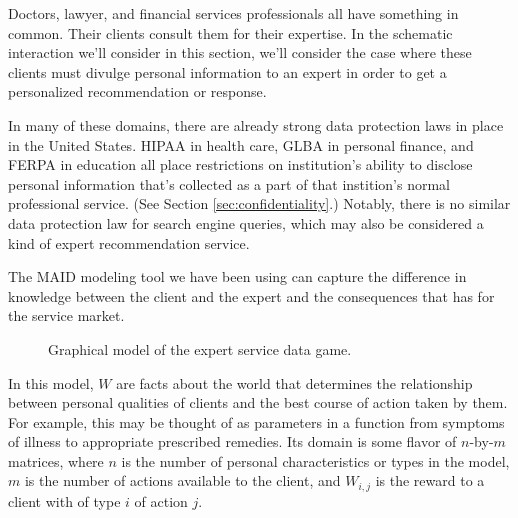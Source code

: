 \documentclass[../thesis.tex]{subfiles}
\begin{document}
Doctors, lawyer, and financial services professionals
all have something in common.
Their clients consult them for their expertise.
In the schematic interaction we'll consider in this
section, we'll consider the case where these clients
must divulge personal information to an expert in
order to get a personalized recommendation or response.

In many of these domains, there are already strong data
protection laws in place in the United States. 
HIPAA in health care,
GLBA in personal finance, and FERPA in education all
place restrictions on institution's ability to disclose personal
information that's collected as a part of that instition's
normal professional service. (See Section \ref{sec:confidentiality}.)
Notably, there is no similar data protection law for search
engine queries, which may also be considered a kind of expert
recommendation service.

The MAID modeling tool we have been using can capture
the difference in knowledge between the client and
the expert and the consequences that has for the service
market.

\begin{figure}
\begin{center}
\end{center}
\caption{Graphical model of the expert service data game.}
\end{figure}

In this model, $W$ are facts about the world that
determines the relationship between personal qualities
of clients and the best course of action taken by them.
For example, this may be thought of as parameters in
a function from symptoms of illness to appropriate prescribed
remedies.
Its domain is some flavor of $n$-by-$m$ matrices, where
$n$ is the number of personal characteristics or types in the model,
$m$ is the number of actions available to the client,
and $W_{i,j}$ is the reward to a client with of type $i$
of action $j$.
\end{document}
